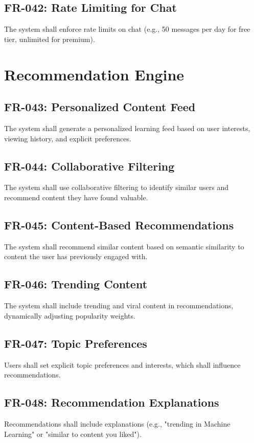 \documentclass{report}
\begin{document}
\subsection{FR-042: Rate Limiting for Chat}
The system shall enforce rate limits on chat (e.g., 50 messages per day for free tier, unlimited for premium).

\section{Recommendation Engine}

\subsection{FR-043: Personalized Content Feed}
The system shall generate a personalized learning feed based on user interests, viewing history, and explicit preferences.

\subsection{FR-044: Collaborative Filtering}
The system shall use collaborative filtering to identify similar users and recommend content they have found valuable.

\subsection{FR-045: Content-Based Recommendations}
The system shall recommend similar content based on semantic similarity to content the user has previously engaged with.

\subsection{FR-046: Trending Content}
The system shall include trending and viral content in recommendations, dynamically adjusting popularity weights.

\subsection{FR-047: Topic Preferences}
Users shall set explicit topic preferences and interests, which shall influence recommendations.

\subsection{FR-048: Recommendation Explanations}
Recommendations shall include explanations (e.g., "trending in Machine Learning" or "similar to content you liked").
\end{document}
